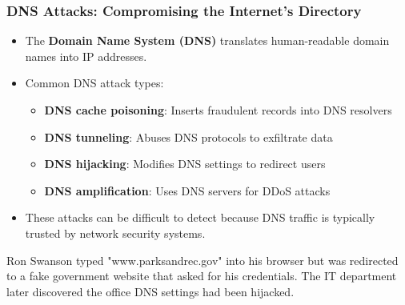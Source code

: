 \documentclass{beamer}
\begin{document}
\begin{frame}
    \frametitle{DNS Attacks: Compromising the Internet's Directory}
    
    \begin{itemize}
        \item The \textbf{Domain Name System (DNS)} translates human-readable domain names into IP addresses.
        \item Common DNS attack types:
            \begin{itemize}
                \item \textbf{DNS cache poisoning}: Inserts fraudulent records into DNS resolvers
                \item \textbf{DNS tunneling}: Abuses DNS protocols to exfiltrate data
                \item \textbf{DNS hijacking}: Modifies DNS settings to redirect users
                \item \textbf{DNS amplification}: Uses DNS servers for DDoS attacks
            \end{itemize}
        \item These attacks can be difficult to detect because DNS traffic is typically trusted by network security systems.
    \end{itemize}
    
    \begin{example}
        Ron Swanson typed "www.parksandrec.gov" into his browser but was redirected to a fake government website that asked for his credentials. The IT department later discovered the office DNS settings had been hijacked.
    \end{example}
\end{frame}
\end{document}
